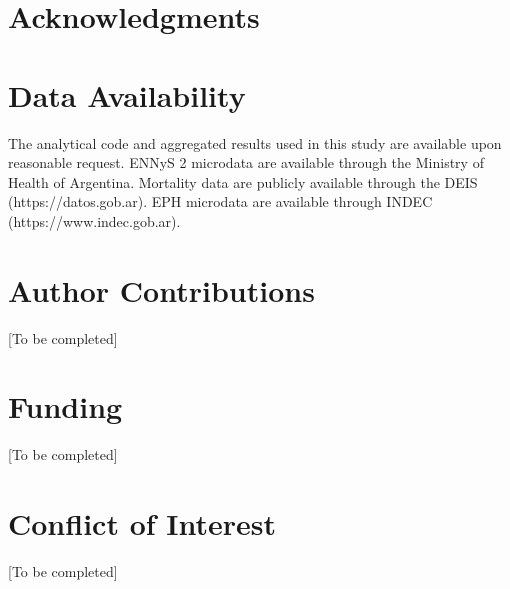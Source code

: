 ﻿\documentclass{article}
\begin{document}

\section*{Acknowledgments}\label{acknowledgments}

\section*{Data Availability}\label{data-availability}

The analytical code and aggregated results used in this study are
available upon reasonable request. ENNyS 2 microdata are available
through the Ministry of Health of Argentina. Mortality data are publicly
available through the DEIS (https://datos.gob.ar). EPH microdata are
available through INDEC (https://www.indec.gob.ar).

\section*{Author Contributions}\label{author-contributions}

{[}To be completed{]}

\section*{Funding}\label{funding}

{[}To be completed{]}

\section*{Conflict of Interest}\label{conflict-of-interest}

{[}To be completed{]}
\end{document}
